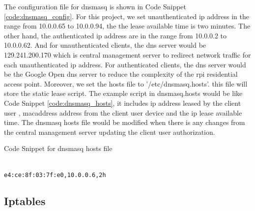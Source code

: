 \par The configuration file for dnsmasq is shown in Code Snippet \ref{code:dnsmasq_config}. For this project, we set unauthenticated \gls{ip} address in the range from 10.0.0.65 to 10.0.0.94, the the lease available time is two minutes. The other hand, the authenticated \gls{ip} address are in the range from 10.0.0.2 to 10.0.0.62. And for unauthenticated clients, the \gls{dns} server would be 129.241.200.170 which is central management server to redirect network traffic for each unauthenticated \gls{ip} address. For authenticated clients, the \gls{dns} server would be the Google Open \gls{dns} server to reduce the complexity of the \gls{rpi} residential access point. Moreover, we set the hosts file to '/etc/dnsmasq.hosts'. this file will store the static lease script. The example script in dnsmasq.hosts would be like Code Snippet \ref{code:dnsmasq_hosts}, it includes \gls{ip} address leased by the client user , \gls{macaddress} address from the client user device and the \gls{ip} lease available time. The dnsmasq hosts file would be modified when there is any changes from the central management server updating the client user authorization.

\begin{algorithm}[h]
  \caption{Code Snippet for dnsmasq hosts file}
  \label{code:dnsmasq_hosts}
  \begin{verbatim}
  
e4:ce:8f:03:7f:e0,10.0.0.6,2h
 \end{verbatim}
\end{algorithm}

\subsection{Iptables}
\par 

